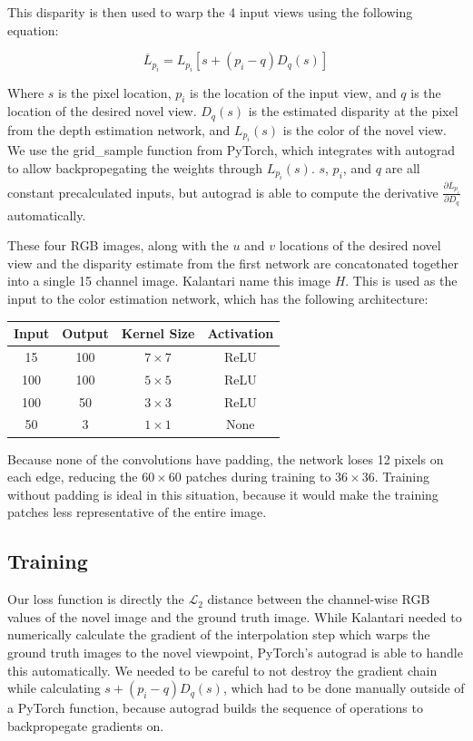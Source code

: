\documentclass[10pt,twocolumn,letterpaper]{article}
\begin{document}
This disparity is then used to warp the 4 input views using the following equation:

$$
\overline{L}_{p_i} = L_{p_i} \left[ s + \left(p_i - q\right) D_q(s) \right]
$$

Where $s$ is the pixel location, $p_i$ is the location of the input view, and $q$ is the location of the
desired novel view. $D_q(s)$ is the estimated disparity at the pixel from the depth estimation network,
and $L_{p_i}(s)$ is the color of the novel view. We use the grid\_sample function from PyTorch, which integrates
with autograd to allow backpropegating the weights through $L_{p_i}(s)$. $s$, $p_i$, and $q$ are all 
constant precalculated inputs, but autograd is able to compute the derivative 
$\frac{\partial \overline{L}_{p_i}}{\partial D_q}$ automatically. 

These four RGB images, along with the $u$ and $v$ 
locations of the desired novel view and the disparity estimate from the first network are concatonated
together into a single 15 channel image. Kalantari \etal name this image $H$. This is used as the input to the color estimation network, which
has the following architecture:

\begin{center}
\begin{tabular}{|c c c c|}
    Input & Output & Kernel Size & Activation \\
    \hline
    15 & 100 & $7 \times 7$ & ReLU \\
    100 & 100 & $5 \times 5$ & ReLU \\
    100 & 50 & $3 \times 3$ & ReLU \\
    50 & 3 & $1 \times 1$ & None \\
\end{tabular}
\end{center}

Because none of the convolutions have padding, the network loses 12 pixels on each edge, reducing
the $60 \times 60$ patches during training to $36 \times 36$. Training without padding is ideal in this situation, 
because it would make the training patches less representative of the entire image.

\subsection{Training}

Our loss function is directly the $\mathcal{L}_2$ distance between the channel-wise RGB values of the novel image
and the ground truth image. While Kalantari \etal needed to numerically calculate the gradient of the interpolation
step which warps the ground truth images to the novel viewpoint, PyTorch's autograd is able to handle this automatically.
We needed to be careful to not destroy the gradient chain while calculating $s + \left(p_i - q\right) D_q(s)$, which had
to be done manually outside of a PyTorch function, because autograd builds the sequence of 
operations to backpropegate gradients on.
\end{document}
